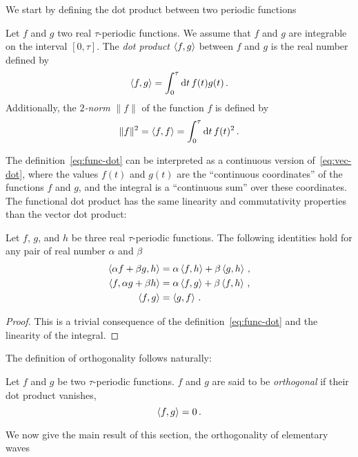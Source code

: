 We start by defining the dot product between two periodic functions
\begin{definition}
  \label{def:func-dot}
  Let $f$ and $g$ two real $\tau$-periodic functions. We assume that $f$ and $g$ are
  integrable on the interval $[0,\tau]$. The \emph{dot product} $\braket{f,g}$ between $f$
  and $g$ is the real number defined by
  \begin{equation}
    \braket{f,g}=\int_{0}^{\tau}\mathrm{d} t\, f(t)g(t)\,.\label{eq:func-dot}
  \end{equation}
  Additionally, the \emph{$2$-norm} $\|f\|$ of the function $f$ is defined by
  \begin{equation}
    \|f\|^2=\braket{f,f}=\int_{0}^{\tau}\mathrm{d} t\, f(t)^2\,.
  \end{equation}
\end{definition}
The definition~\cref{eq:func-dot} can be interpreted as a continuous version
of~\cref{eq:vec-dot}, where the values $f(t)$ and $g(t)$ are the ``continuous
coordinates'' of the functions $f$ and $g$, and the integral is a ``continuous sum'' over
these coordinates. The functional dot product has the same linearity and commutativity
properties than the vector dot product:
\begin{proposition}
  Let $f$, $g$, and $h$ be three real $\tau$-periodic functions. The following identities
  hold for any pair of real number $\alpha$ and $\beta$
  \begin{align}
    \braket{\alpha f+\beta g,h}&=\alpha\braket{f,h}+\beta\braket{g,h}\,,\\
    \braket{f,\alpha g+\beta h}&=\alpha\braket{f,g}+\beta\braket{f,h}\,,\\
    \braket{f,g}&=\braket{g,f}\,.
  \end{align}
\end{proposition}
\begin{proof}
  This is a trivial consequence of the definition~\cref{eq:func-dot} and the linearity of
  the integral.
\end{proof}
The definition of orthogonality follows naturally:
\begin{definition}
  \label{def:dot-rfunc}
  Let $f$ and $g$ be two $\tau$-periodic functions. $f$ and $g$ are said to be
  \emph{orthogonal} if their dot product vanishes, \ie
  \begin{equation}
    \braket{f,g}=0\,.
  \end{equation}
\end{definition}
We now give the main result of this section, \ie the orthogonality of elementary waves
